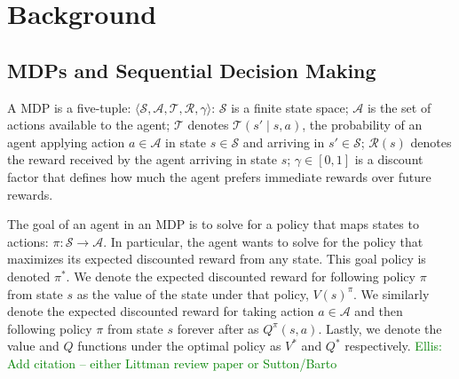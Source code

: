 \documentclass{article}
\newcommand\enote[1]{\textcolor{green}{Ellis: #1}}
\begin{document}

\section{Background}

\subsection{\acp{MDP} and Sequential Decision Making}
A \ac{MDP} is a five-tuple: $\langle \mathcal{S}, \mathcal{A}, \mathcal{T}, \mathcal{R}, \gamma \rangle$: $\mathcal{S}$ is a finite state space; $\mathcal{A}$ is the set of actions available to the agent; $\mathcal{T}$ denotes $\mathcal{T}(s' \mid s,a)$, the probability of an agent applying action $a \in \mathcal{A}$ in state $s \in \mathcal{S}$ and arriving in $s' \in \mathcal{S}$; $\mathcal{R}(s)$ denotes the reward received by the agent arriving in state $s$; $\gamma \in [0, 1]$ is a discount  factor that defines how much the agent prefers immediate rewards over future rewards.

The goal of an agent in an \ac{MDP} is to solve for a policy that maps states to actions: $\pi: \mathcal{S} \rightarrow \mathcal{A}$. In particular, the agent wants to solve for the policy that maximizes its expected discounted reward from any state. This goal policy is denoted $\pi^*$. We denote the expected discounted reward for following policy $\pi$ from state $s$ as the value of the state under that policy, $V(s)^\pi$. We similarly denote the expected discounted reward for taking action $a \in \mathcal{A}$ and then following policy $\pi$ from state $s$ forever after as $Q^\pi(s,a)$. Lastly, we denote the value and $Q$ functions under the optimal policy as $V^*$ and $Q^*$ respectively. \enote{Add citation -- either Littman review paper or Sutton/Barto}
\end{document}
